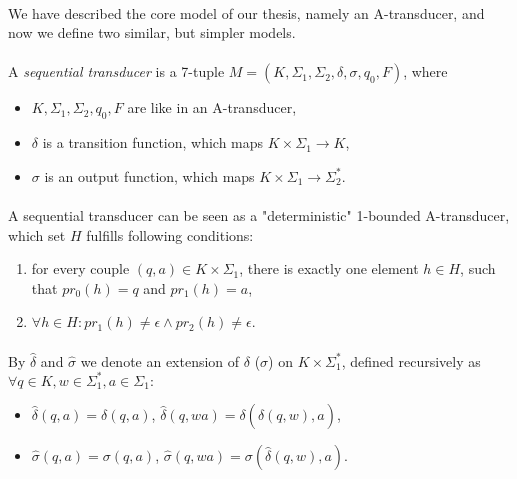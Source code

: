 \paragraph{}
We have described the core model of our thesis, namely an A-transducer, and now we define two similar, but simpler models.

\paragraph{}
 A \emph{sequential transducer} is a 7-tuple $M=(K, \Sigma_{1}, \Sigma_{2}, \delta, \sigma, q_{0}, F)$, where
\begin{itemize} 
\item $K, \Sigma_{1}, \Sigma_{2}, q_{0}, F$ are like in an A-transducer,
\item $\delta $ is a transition function, which maps $K \times \Sigma_{1} \rightarrow K$,
\item $\sigma $ is an output function, which maps $K \times \Sigma_{1} \rightarrow \Sigma_{2}^{*} $.
\end{itemize}

\paragraph{} 
A sequential transducer can be seen as a "deterministic" 1-bounded A-transducer, which set $H$ fulfills following conditions:
\begin{enumerate}
\item for every couple $(q, a) \in K \times \Sigma_{1}$, there is exactly one element $h \in H$, such that $pr_{0}(h) = q$ and $pr_{1}(h) = a$,
\item $\forall h \in H: pr_{1}(h) \neq \epsilon \wedge pr_{2}(h) \neq \epsilon $.
\end{enumerate}

\paragraph{}
\oznacenie By $\hat{\delta}$ and $\hat{\sigma}$ we denote an extension of $\delta $ ($\sigma $) on $K \times \Sigma_{1}^{*} $, defined recursively as \\
$\forall q \in K, w \in \Sigma_{1}^{*}, a \in \Sigma_{1}:$ \\
\begin{itemize} 
\item $\hat{\delta}(q, a) = \delta (q,a)$, $\hat{\delta}(q,wa) = \delta (\hat{\delta}(q, w), a)$,
\item $\hat{\sigma}(q, a) = \sigma (q,a)$, $\hat{\sigma}(q,wa) = \sigma (\hat{\delta}(q, w), a)$.
\end{itemize}


